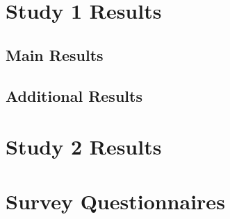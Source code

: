 \section{Study 1 Results}
\label{sec:appendix_study1}

\subsection{Main Results}








\clearpage
\subsection{Additional Results}

















\clearpage

\section{Study 2 Results}
\label{sec:appendix_study2}











\clearpage


\clearpage






\clearpage

\section{Survey Questionnaires}

